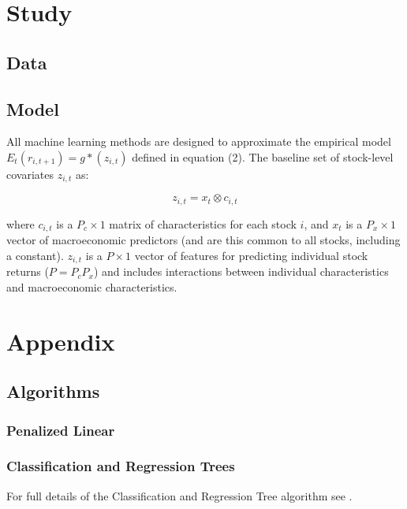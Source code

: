 \documentclass[a4paper]{article}
\newcommand{\smalltodo}[2][] {\todo[caption={#2}, size=\scriptsize,%
	fancyline,#1]{\begin{spacing}{.5}#2\end{spacing}}}
\newcommand{\rhs}[2][]{\smalltodo[color=green!30,#1]{{\bf RS:} #2}}
\begin{document}
\section{Study}

\subsection{Data}

\rhs{Pending}

\subsection{Model}

All machine learning methods are designed to approximate the empirical model \( E_t(r_{i, t+1}) = g*(z_{i,t}) \) defined in equation (2). The baseline set of stock-level covariates \( z_{i,t} \) as:

\begin{equation}
	z_{i,t} = x_t \otimes c_{i,t}
\end{equation}

where \( c_{i,t} \) is a \( P_c \times 1 \) matrix of characteristics for each stock \(i\), and \(x_t\) is a $P_x \times 1$ vector of macroeconomic predictors (and are this common to all stocks, including a constant). $z_{i,t}$ is a $P \times 1$ vector of features for predicting individual stock returns ($P = P_cP_x$) and includes interactions between individual characteristics and macroeconomic characteristics. 

\section{Appendix}

\subsection{Algorithms}
\label{Algorithms}

\subsubsection{Penalized Linear}

\subsubsection{Classification and Regression Trees}

For full details of the Classification and Regression Tree algorithm see \cite{breiman_classification_2017}. 
\end{document}
